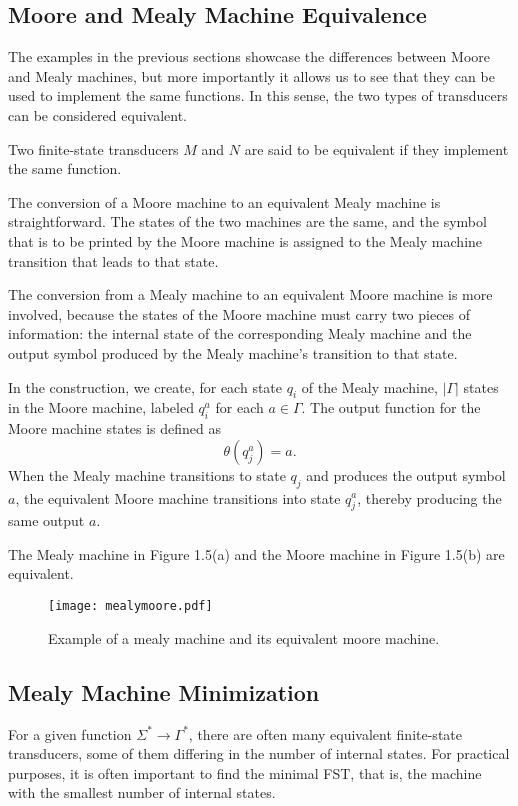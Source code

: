 \subsection{Moore and Mealy Machine Equivalence}

The examples in the previous sections showcase the differences between Moore and Mealy machines, 
but more importantly it allows us to see that they can be used to implement the same functions.
In this sense, the two types of transducers can be considered equivalent.

Two finite-state transducers \(M\) and \(N\) are said to be equivalent if they implement the same function.\cite{linz2011formal}

The conversion of a Moore machine to an equivalent Mealy machine is straightforward. The
states of the two machines are the same, and the symbol that is to be printed by the Moore machine is
assigned to the Mealy machine transition that leads to that state.

The conversion from a Mealy machine to an equivalent Moore machine is more involved, 
because the states of the Moore machine must carry two pieces of information: 
the internal state of the corresponding Mealy machine and the output symbol produced by the Mealy machine's transition to that state.

In the construction, we create, for each state \( q_i \) of the Mealy machine, \(|\Gamma|\) states in the Moore machine, 
labeled \( q_{i}^{a} \) for each \( a \in \Gamma \). The output function for the Moore machine states is defined as
\[
\theta(q_{j}^{a}) = a.
\]
When the Mealy machine transitions to state \( q_j \) and produces the output symbol \( a \), 
the equivalent Moore machine transitions into state \( q_{j}^{a} \), thereby producing the same output \( a \).

The Mealy machine in Figure 1.5(a) and the Moore machine in Figure 1.5(b) are equivalent.

\begin{figure}[H]
    \centering
    \texttt{[image: mealymoore.pdf]}
    \caption{Example of a mealy machine and its equivalent moore machine.}
    \label{fig:5}
\end{figure}

\subsection{Mealy Machine Minimization}

For a given function \(\Sigma^* \rightarrow \Gamma^*\), there are often many equivalent finite-state transducers, 
some of them differing in the number of internal states. For practical purposes, it is often important to find the
minimal FST, that is, the machine with the smallest number of internal states.

